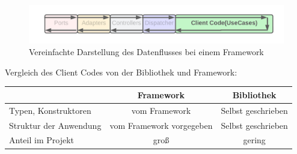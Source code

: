 \begin{figure}[H]
    \centering
    \includegraphics[width=1\textwidth]{./images/Dataflow Framework.png}
    \caption{Vereinfachte Darstellung des Datenflusses bei einem Framework}
    \label{fig:SimpliedDataflowFramework}
\end{figure}

Vergleich des Client Codes von der Bibliothek und Framework: 

\begin{tabular}{ |l|c|c| } 
    \hline
                                                            & Framework & Bibliothek \\ 
                                                            \hline
    Typen, Konstruktoren                                    & vom Framework             & Selbst geschrieben \\ 
    \hline
    Struktur der Anwendung                                  & vom Framework vorgegeben  & Selbst geschrieben \\
    \hline
    Anteil im Projekt                                       & groß       & gering \\ 
    \hline
\end{tabular}